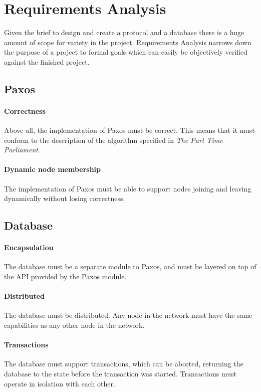 \documentclass[12pt,twoside,notitlepage]{report}
\begin{document}
\section{Requirements Analysis}

Given the brief to design and create a protocol and a database there is a huge amount of scope for
variety in the project. Requirements Analysis narrows down the purpose of a project to formal
goals which can easily be objectively verified against the finished project.

\subsection*{Paxos}
\paragraph{Correctness} Above all, the implementation of Paxos must be correct. This means that it
must conform to the description of the algorithm specified in \emph{The Part Time Parliament}.
\paragraph{Dynamic node membership} The implementation of Paxos must be able to support nodes
joining and leaving dynamically without losing correctness.

\subsection*{Database}
\paragraph{Encapsulation} The database must be a separate module to Paxos, and must be layered on
top of the API provided by the Paxos module.
\paragraph{Distributed} The database must be distributed. Any node in the network must have the
same capabilities as any other node in the network.
\paragraph{Transactions} The database must support transactions, which can be aborted, returning
the database to the state before the transaction was started. Transactions must operate in
isolation with each other.
\end{document}
